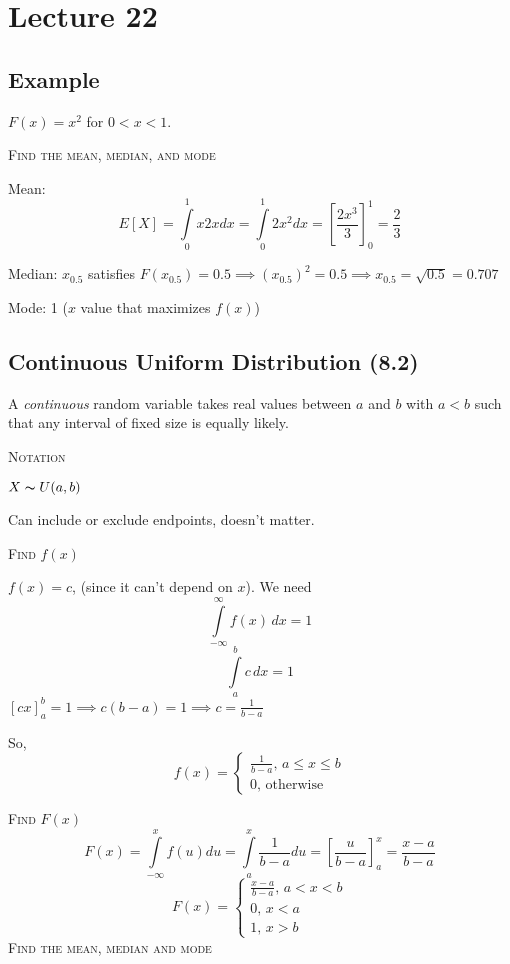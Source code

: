 \section{Lecture 22}
\subsection{Example}
$ F(x)=x^2 $ for $ 0<x<1 $.

\textsc{Find the mean, median, and mode}

Mean:
\[ E[X]=\int\limits_{0}^{1} x2x d{x} =\int\limits_{0}^{1} 2x^2 d{x}=
\left[\frac{2x^3}{3}\right]_0^1=\frac{2}{3} \]

Median:
$ x_{0.5} $ satisfies $ F(x_{0.5})=0.5 \implies (x_{0.5})^2=0.5\implies x_{0.5}=
\sqrt{0.5}=0.707$

Mode: 1 ($ x $ value that maximizes $ f(x) $)

\subsection{Continuous Uniform Distribution (8.2)}
A \emph{continuous} random variable takes real values between $ a $ and
$ b $ with $ a<b $ such that any interval of fixed size is equally likely.

\textsc{Notation}

$ X \thicksim U(a,b) $
\begin{remark}
    Can include or exclude endpoints, doesn't matter.
\end{remark}

\textsc{Find $f(x)$}

$ f(x)=c $, (since it can't depend on $ x $). We need
\[ \int\limits_{-\infty}^{\infty} f(x)\,d{x} =1 \]
\[ \int\limits_{a}^{b} c\,d{x} =1 \]
$ \left[cx\right]_a^b=1\implies c(b-a)=1\implies c=\frac{1}{b-a} $

So,
\[ f(x)=\begin{cases}
    \frac{1}{b-a},\, a\le x\le b\\
    0,\, \text{otherwise}
\end{cases} \]

\textsc{Find $ F(x) $}
\[ F(x)=\int\limits_{-\infty}^{x} f(u) d{u}
=\int\limits_{a}^{x} \frac{1}{b-a} d{u}
=\left[\frac{u}{b-a}\right]_a^x=\frac{x-a}{b-a} \]
\[ F(x)=\begin{cases}
    \frac{x-a}{b-a},\, a<x<b\\
    0,\,x<a\\
    1,\,x>b
\end{cases} \]
\textsc{Find the mean, median and mode}

